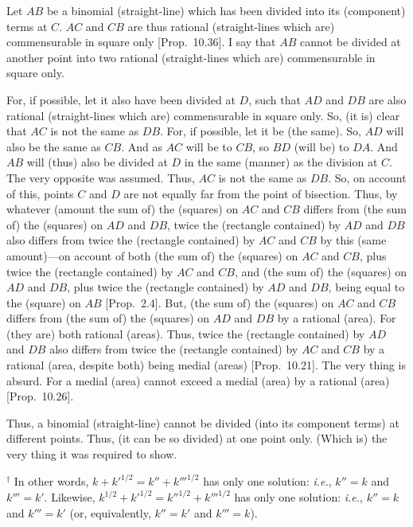 \begin{Parallel}{}{}
{Let $AB$ be a binomial (straight-line) which has been divided into its
(component) terms at $C$. $AC$ and $CB$ are thus
rational (straight-lines which are) commensurable in square only [Prop.~10.36]. I say that $AB$ cannot be divided
at another point
into two rational (straight-lines which are) commensurable in square only.

For, if possible, let it also have been divided at $D$, such that $AD$ and
$DB$ are also rational (straight-lines which are) commensurable in
square only. So, (it is) clear that $AC$ is not the same as $DB$.
For, if possible, let it be (the same). So, $AD$ will also be the same
as $CB$. And as $AC$ will be to $CB$, so $BD$ (will be) to $DA$.
And $AB$ will (thus) also be divided at $D$ in the same (manner) as the division at $C$. The very opposite was assumed. Thus, $AC$ is not the
same as $DB$. So, on account of this,  points $C$ and $D$ are
not equally far from the point of bisection. Thus, by whatever (amount the sum of) the (squares) on $AC$ and $CB$ differs from (the sum of) the
(squares) on $AD$ and $DB$, twice the (rectangle contained)
by $AD$ and $DB$ also differs from twice the (rectangle contained)
by $AC$ and $CB$ by this (same amount)---on account of both (the sum of) the (squares) on $AC$ and
$CB$, plus twice the (rectangle contained) by $AC$ and $CB$, and
(the sum of) the (squares) on $AD$ and $DB$, plus twice the
(rectangle contained) by $AD$ and $DB$,  being equal to the (square) on $AB$ [Prop.~2.4]. But, (the sum of) the
(squares) on  $AC$ and $CB$ differs from (the sum of) the (squares)
on $AD$ and $DB$ by a rational (area). For (they are) both rational (areas).
Thus, twice the (rectangle contained) by $AD$ and $DB$ also differs from
twice the (rectangle contained) by $AC$ and $CB$ by a
rational (area, despite both) being medial (areas) [Prop.~10.21]. The very thing is absurd. For a
medial (area) cannot exceed a medial (area) by a rational (area) [Prop.~10.26].

Thus, a binomial (straight-line) cannot be divided (into its component terms) at different points.
Thus, (it can be so divided) at one point only. (Which is) the very thing it
was required to show.}
\end{Parallel}
{\footnotesize\noindent$^\dag$ In other words, $k + {k'}^{1/2} = k'' + {k'''}^{1/2}$
has only one solution: {\em i.e.}, $k''=k$ and ${k'''}=k'$. Likewise,
$k^{1/2} + {k'}^{1/2} = {k''}^{1/2}+ {k'''}^{1/2}$ has only one solution:
{\em i.e.}, $k''=k$ and $k'''=k'$ (or, equivalently, $k''=k'$ and $k'''=k$).}

